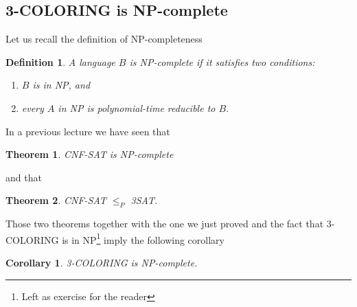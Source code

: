\documentclass{article}
\newcommand{\theoremname}{Theorem}
\newcommand{\corollaryname}{Corollary}
\newcommand{\definitionname}{Definition}
\newtheorem{theorem}{\theoremname}
\newtheorem{corollary}{\corollaryname}
\newtheorem{definition}{\definitionname}
\begin{document}
\subsection{3-COLORING is NP-complete}

Let us recall the definition of NP-completeness
\begin{definition}
	A language \(B\) is NP-complete if it satisfies two conditions:
	\begin{enumerate}
		\item \(B\) is in NP, and
		\item every \(A\) in NP is polynomial-time reducible to \(B\).
	\end{enumerate}
\end{definition}

In a previous lecture we have seen that
\begin{theorem}
	CNF-SAT is NP-complete
\end{theorem}
and that
\begin{theorem}
	CNF-SAT \(\le_P\) 3SAT.
\end{theorem}
Those two theorems together with the one we just proved and the fact that
3-COLORING is in NP\footnote{Left as exercise for the reader}
imply the following corollary
\begin{corollary}
	3-COLORING is NP-complete.
\end{corollary}
\end{document}
